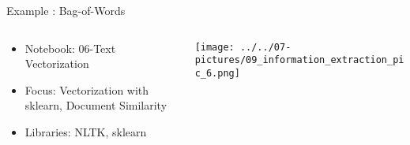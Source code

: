 \documentclass[11pt]{beamer}
\begin{document}
\begin{frame}{Example : Bag-of-Words}
\begin{columns}[T] %
\begin{column}{.48\textwidth}
        \begin{itemize}
		\item Notebook: 06-Text Vectorization
		\item Focus: Vectorization with sklearn, Document Similarity
		\item Libraries: NLTK, sklearn
        \end{itemize}
\end{column}%
\hfill%
\begin{column}{.48\textwidth}
        \texttt{[image: ../../07-pictures/09\_information\_extraction\_pic\_6.png]}
\end{column}%
\end{columns}
\end{frame}
\end{document}
